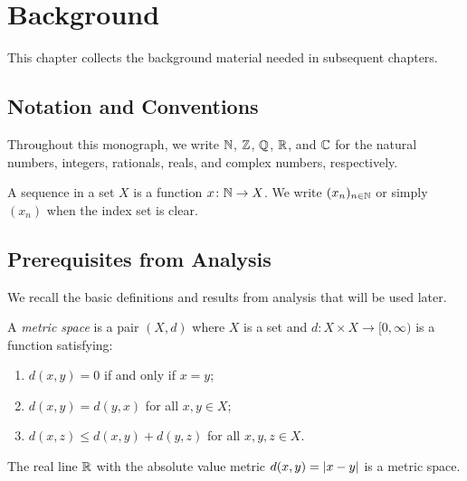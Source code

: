 
\chapter{Background}\label{cha:background}

This chapter collects the background material needed in subsequent chapters.

\section{Notation and Conventions}\label{sec:notation}

Throughout this monograph, we write $\mathbb{N}$, $\mathbb{Z}$, $\mathbb{Q}$, $\mathbb{R}$, and $\mathbb{C}$
for the natural numbers, integers, rationals, reals, and complex numbers,
respectively.

\begin{notation}\label{notn:sequences}
  A sequence in a set $X$ is a function $x \colon \mathbb{N} \to X$.
  We write $(x_n)_{n \in \mathbb{N}}$ or simply $(x_n)$ when the index set is clear.
\end{notation}

\section{Prerequisites from Analysis}\label{sec:prerequisites-analysis}

We recall the basic definitions and results from analysis that will be used later.

\begin{definition}\label{def:metric-space}
  A \emph{metric space} is a pair $(X, d)$ where $X$ is a set and
  $d \colon X \times X \to [0, \infty)$ is a function satisfying:
  \begin{enumerate}
  \item
    $d(x, y) = 0$ if and only if $x = y$;
  \item
    $d(x, y) = d(y, x)$ for all $x, y \in X$;
  \item
    $d(x, z) \le d(x, y) + d(y, z)$ for all $x, y, z \in X$.
  \end{enumerate}
\end{definition}

\begin{example}\label{exa:euclidean-metric}
  The real line $\mathbb{R}$ with the absolute value metric $d(x, y) = \lvert x - y\rvert$
  is a metric space.
\end{example}

